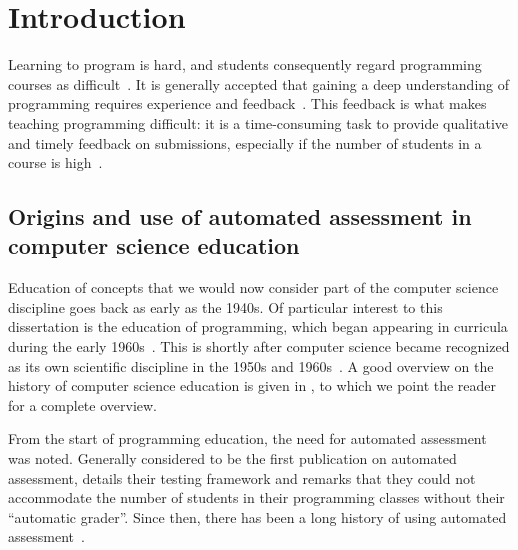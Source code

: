 \documentclass[../main]{subfiles}
\begin{document}
\chapter{Introduction}\label{ch:introduction}

Learning to program is hard, and students consequently regard programming courses as difficult~\autocite{robinsLearningTeachingProgramming2003,simoesNatureProgrammingExercises2020}.
It is generally accepted that gaining a deep understanding of programming requires experience and feedback~\autocite{gomesEnvironmentImproveProgramming2007,hattiePowerFeedback2007}.
This feedback is what makes teaching programming difficult: it is a time-consuming task to provide qualitative and timely feedback on submissions, especially if the number of students in a course is high~\autocite{zavalaUseSemanticbasedAIG2018,staubitzRepositoryOpenAutogradable2017,queirosPexilProgrammingExercises2011,pirttinenCrowdsourcingProgrammingAssignments2018,gulwaniFeedbackGenerationPerformance2014,tangDatadrivenTestCase2016}.

\section{Origins and use of automated assessment in computer science education}\label{sec:automated-assessment-in-computer-science-education}

Education of concepts that we would now consider part of the computer science discipline goes back as early as the 1940s.
Of particular interest to this dissertation is the education of programming, which began appearing in curricula during the early 1960s~\autocite{simonEmergenceComputingEducation2015}.
This is shortly after computer science became recognized as its own scientific discipline in the 1950s and 1960s~\autocite{hopcroftComputerScienceEmergence1987,atchisonComputerScienceNew1971,gornComputerInformationSciences1963,knuthComputerScienceIts1974,denningScienceComputerScience2013}.
A good overview on the history of computer science education is given in \textcite{tedreChangingAimsComputing2018}, to which we point the reader for a complete overview.

From the start of programming education, the need for automated assessment was noted.
Generally considered to be the first publication on automated assessment, \textcite{hollingsworthAutomaticGradersProgramming1960} details their testing framework and remarks that they could not accommodate the number of students in their programming classes without their ``automatic grader''.
Since then, there has been a long history of using automated assessment~\autocite{ala-mutkaSurveyAutomatedAssessment2005,douceAutomaticTestbasedAssessment2005,ihantolaReviewRecentSystems2010,paivaAutomatedAssessmentComputer2022,combefisAutomatedCodeAssessment2022,nayakAutomatedAssessmentTools2022,messerAutomatedGradingFeedback2024}.
\end{document}

